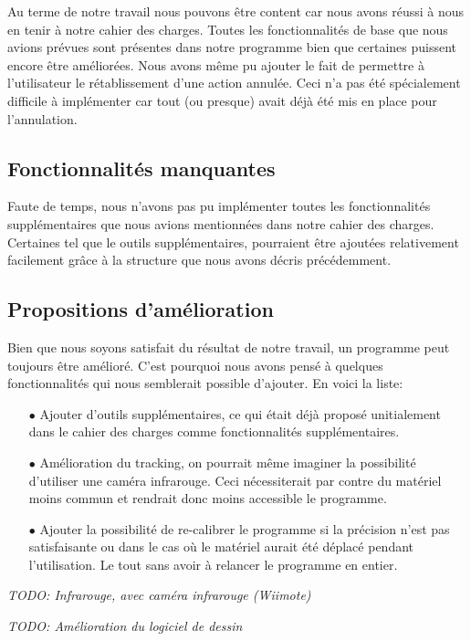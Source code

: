 \documentclass[11pt,a4paper,oldfontcommands]{memoir}
\begin{document}
Au terme de notre travail nous pouvons être content car nous avons réussi à nous en tenir à notre cahier des charges. Toutes les fonctionnalités de base que nous avions prévues sont présentes dans notre programme bien que certaines puissent encore être améliorées. Nous avons même pu ajouter le fait de permettre à l'utilisateur le rétablissement d'une action annulée. Ceci n'a pas été spécialement difficile à implémenter car tout (ou presque) avait déjà été mis en place pour l'annulation.

\subsection{Fonctionnalités manquantes}

Faute de temps, nous n'avons pas pu implémenter toutes les fonctionnalités supplémentaires que nous avions mentionnées dans notre cahier des charges. Certaines tel que le outils supplémentaires, pourraient être ajoutées relativement facilement grâce à la structure que nous avons décris précédemment.

\subsection{Propositions d'amélioration}

Bien que nous soyons satisfait du résultat de notre travail, un programme peut toujours être amélioré. C'est pourquoi nous avons pensé à quelques fonctionnalités qui nous semblerait possible d'ajouter. En voici la liste:
\begin{itemize}
\item[$\bullet$] Ajouter d'outils supplémentaires, ce qui était déjà proposé unitialement dans le cahier des charges comme fonctionnalités supplémentaires.
\item[$\bullet$] Amélioration du tracking, on pourrait même imaginer la possibilité d'utiliser une caméra infrarouge. Ceci nécessiterait par contre du matériel moins commun et rendrait donc moins accessible le programme.
\item[$\bullet$] Ajouter la possibilité de re-calibrer le programme si la précision n'est pas satisfaisante ou dans le cas où le matériel aurait été déplacé pendant l'utilisation. Le tout sans avoir à relancer le programme en entier.
\end{itemize}

\textit{TODO: Infrarouge, avec caméra infrarouge (Wiimote)}

\textit{TODO: Amélioration du logiciel de dessin}
\end{document}
